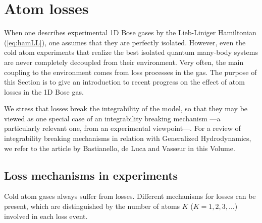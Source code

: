 \documentclass[onecolumn,amsfonts,showpacs,superscriptaddress]{revtex4-1}
\begin{document}
\newpage

\section{Atom losses}
\label{sec:losses}
When one describes experimental 1D Bose gases by the Lieb-Liniger Hamiltonian (\ref{eq:hamLL}), one assumes that they are perfectly isolated. However, even the cold atom experiments that realize the best isolated quantum many-body systems are never completely decoupled from their environment. Very often, the main coupling to the environment comes from loss processes in the gas.
The purpose of this Section is to give an introduction to recent progress on the effect of atom losses in the 1D Bose gas.

We stress that losses break the integrability of the model, so that they may be viewed as one special case of an integrability breaking mechanism ---a particularly relevant one, from an experimental viewpoint---. For a review of integrability breaking mechanisms in relation with Generalized Hydrodynamics, we refer to the article by Bastianello, de Luca and Vasseur in this Volume.


\subsection{Loss mechanisms in experiments}
Cold atom gases always suffer from losses. Different mechanisms for losses can be present, 
which are distinguished by the number of atoms $K$ ($K=1,2,3,\dots$) involved in each loss event.
\end{document}
